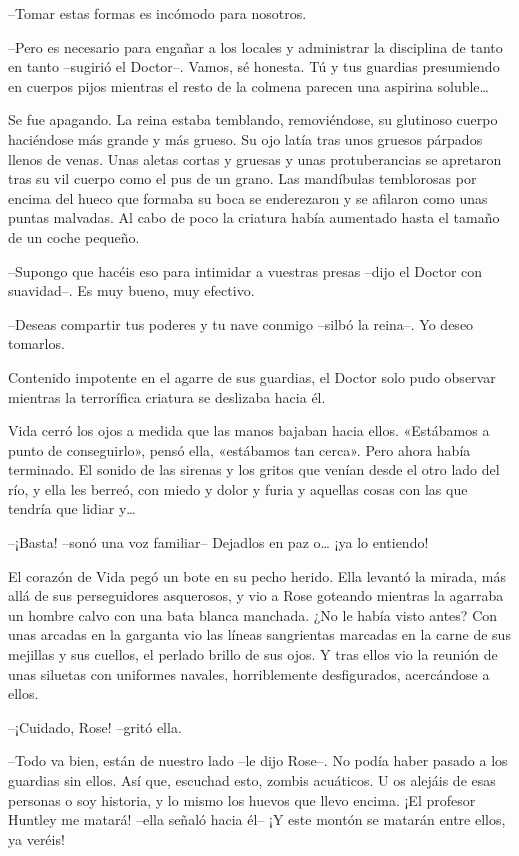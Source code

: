 {--Tomar estas formas es incómodo para nosotros.}

{--Pero es necesario para engañar a los locales y administrar la
 disciplina de tanto en tanto --sugirió el Doctor--. Vamos, sé honesta.
 Tú y tus guardias presumiendo en cuerpos pijos mientras el resto de la
 colmena parecen una aspirina soluble\ldots{}}

{Se fue apagando. La reina estaba temblando, removiéndose, su glutinoso
 cuerpo haciéndose más grande y más grueso. Su ojo latía tras unos
 gruesos párpados llenos de venas. Unas aletas cortas y gruesas y unas
 protuberancias se apretaron tras su vil cuerpo como el pus de un grano.
 Las mandíbulas temblorosas por encima del hueco que formaba su boca se
 enderezaron y se afilaron como unas puntas malvadas. Al cabo de poco la
criatura había aumentado hasta el tamaño de un coche pequeño.}

{--Supongo que hacéis eso para intimidar a vuestras presas --dijo el
Doctor con suavidad--. Es muy bueno, muy efectivo.}

{--Deseas compartir tus poderes y tu nave conmigo --silbó la reina--. Yo
deseo tomarlos.}

{Contenido impotente en el agarre de sus guardias, el Doctor solo pudo
observar mientras la terrorífica criatura se deslizaba hacia él.}

\mbox{}

{Vida cerró los ojos a medida que las manos bajaban hacia ellos.
 «Estábamos a punto de conseguirlo», pensó ella, «estábamos tan cerca».
 Pero ahora había terminado. El sonido de las sirenas y los gritos que
 venían desde el otro lado del río, y ella les berreó, con miedo y dolor
 y furia y aquellas cosas con las que tendría que lidiar y\ldots{}}

{--¡Basta! --sonó una voz familiar-- Dejadlos en paz o\ldots{} ¡ya lo
entiendo!}

{El corazón de Vida pegó un bote en su pecho herido. Ella levantó la
 mirada, más allá de sus perseguidores asquerosos, y vio a Rose goteando
 mientras la agarraba un hombre calvo con una bata blanca manchada. ¿No
 le había visto antes? Con unas arcadas en la garganta vio las líneas
 sangrientas marcadas en la carne de sus mejillas y sus cuellos, el
 perlado brillo de sus ojos. Y tras ellos vio la reunión de unas siluetas
con uniformes navales, horriblemente desfigurados, acercándose a ellos.}

{--¡Cuidado, Rose! --gritó ella.}

{--Todo va bien, están de nuestro lado --le dijo Rose--. No podía haber
 pasado a los guardias sin ellos. Así que, escuchad esto, zombis
 acuáticos. U os alejáis de esas personas o soy historia, y lo mismo los
 huevos que llevo encima. ¡El profesor Huntley me matará! --ella señaló
hacia él-- ¡Y este montón se matarán entre ellos, ya veréis!}

